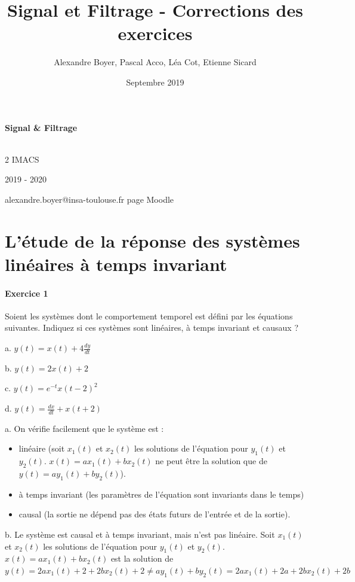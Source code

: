 \documentclass[11pt]{report}
\title{{\huge Signal et Filtrage - Corrections des exercices}}
\author{Alexandre Boyer, Pascal Acco, Léa Cot, Etienne Sicard}
\date{Septembre 2019}
\begin{document}
	\maketitle
	
	\textbf{Signal \& Filtrage}
	
	\textbf{}\\
	
	2 IMACS
	
	2019 - 2020
	
	alexandre.boyer@insa-toulouse.fr	
	page Moodle
	
	
\chapter{}

\newpage


\chapter{L'étude de la réponse des systèmes linéaires à temps invariant}

	\subsubsection{Exercice 1} 
	Soient les systèmes dont le comportement temporel est défini par les équations suivantes. Indiquez si ces systèmes sont linéaires, à temps invariant et causaux ?
	
	a. $y(t) = x(t)+4\frac{dy}{dt}$ 
	
	b. $y(t) = 2x(t)+2$ 
	
	c. $y(t)=e^{-t}x(t-2)^{2}$
	
	d. $y(t)=\frac{dx}{dt}+x(t+2)$
	
	\vspace{1\baselineskip}
	

	
	
	a. On vérifie facilement que le système est :
	 \begin{itemize}
	 	\item linéaire (soit $x_{1}(t) $ et $x_{2}(t)$ les solutions de l'équation pour $y_{1}(t)$ et $y_{2}(t)$. $x(t)=ax_{1}(t)+bx_{2}(t)$ ne peut être la solution que de $y(t)=ay_{1}(t)+by_{2}(t)$).
	 	\item à temps invariant (les paramètres de l'équation sont invariants dans le temps)
	 	\item causal (la sortie ne dépend pas des états futurs de l'entrée et de la sortie).
	 \end{itemize}
 	\vspace{0.5\baselineskip}
 	b. Le système est causal et à temps invariant, mais n'est pas linéaire. Soit  $x_{1}(t) $ et $x_{2}(t)$ les solutions de l'équation pour $y_{1}(t)$ et $y_{2}(t)$. $x(t)= ax_{1}(t)+bx_{2}(t)$ est la solution de $y(t)=2ax_{1}(t)+2+2bx_{2}(t)+2 \neq ay_{1}(t)+by_{2}(t)=2ax_{1}(t)+2a+2bx_{2}(t)+2b$
 	
\end{document}
